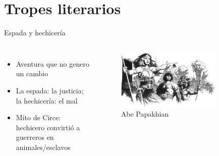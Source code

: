 \section{Tropes literarios}
\note[itemize]{
	\item
}

\begin{frame}{Espada y hechicería}
	\begin{columns}
		\begin{itemize}
			\item Aventura que no genero un cambio
			\item La espada: la justicia; la hechicería: el mal
			\item Mito de Circe: hechicero convirtió a guerreros en animales/esclavos
		\end{itemize}
		\begin{figure}[htb]
			\centering
			\includegraphics[width=0.8\textwidth]{img/tributos/elephant07}
			\caption{Abe Papakhian}
		\end{figure}
	\end{columns}
\end{frame}
\note[itemize]{
	\item
}

